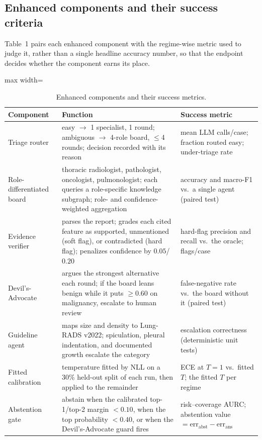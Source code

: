 \documentclass[12pt]{article}
\begin{document}
\subsection{Enhanced components and their success criteria}\label{sec:comp}

Table~1 pairs each enhanced component with the regime-wise metric used to judge it, rather than a single headline accuracy number, so that the endpoint decides whether the component earns its place.

\begin{table}[htbp]
\centering
\small
\renewcommand{\arraystretch}{1.25}
\setlength{\tabcolsep}{5pt}
\begin{adjustbox}{max width=\linewidth}
\begin{tabular}{|p{}|p{}|p{}|}
\hline
\rowcolor{tblhead}
\textbf{Component} & \textbf{Function} & \textbf{Success metric} \\ \hline
Triage router & easy $\to$ 1 specialist, 1 round; ambiguous $\to$ 4-role board, $\le$4 rounds; decision recorded with its reason & mean LLM calls/case; fraction routed easy; under-triage rate \\
\hline
Role-differentiated board & thoracic radiologist, pathologist, oncologist, pulmonologist; each queries a role-specific knowledge subgraph; role- and confidence-weighted aggregation & accuracy and macro-F1 vs.\ a single agent (paired test) \\
\hline
Evidence verifier & parses the report; grades each cited feature as supported, unmentioned (soft flag), or contradicted (hard flag); penalizes confidence by $0.05$/$0.20$ & hard-flag precision and recall vs.\ the oracle; flags/case \\
\hline
Devil's-Advocate & argues the strongest alternative each round; if the board leans benign while it puts $\ge 0.60$ on malignancy, escalate to human review & false-negative rate vs.\ the board without it (paired test) \\
\hline
Guideline agent & maps size and density to Lung-RADS v2022; spiculation, pleural indentation, and documented growth escalate the category & escalation correctness (deterministic unit tests) \\
\hline
Fitted calibration & temperature fitted by NLL on a 30\% held-out split of each run, then applied to the remainder & ECE at $T{=}1$ vs.\ fitted $T$; the fitted $T$ per regime \\
\hline
Abstention gate & abstain when the calibrated top-1/top-2 margin $<0.10$, when the top probability $<0.40$, or when the Devil's-Advocate guard fires & risk--coverage AURC; abstention value $=\mathrm{err}_{\mathrm{abst}}-\mathrm{err}_{\mathrm{ans}}$ \\
\hline
\end{tabular}
\end{adjustbox}
\caption{Enhanced components and their success metrics.}
\label{tab:components}
\end{table}
\end{document}
